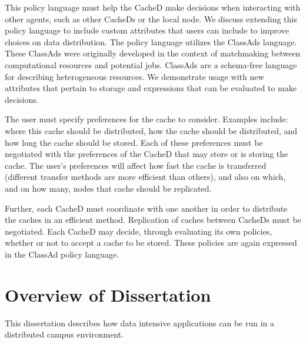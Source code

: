 This policy language must help the CacheD make decisions when interacting with other agents, such as other CacheDs or the local node.  We discuss extending this policy language to include custom attributes that users can include to improve choices on data distribution.  The policy language utilizes the \mbox{ClassAds} \cite{raman1998matchmaking} language.  These \mbox{ClassAds} were originally developed in the context of matchmaking between computational resources and potential jobs.  ClassAds are a schema-free language for describing heterogeneous resources.  We demonstrate usage with new attributes that pertain to storage and expressions that can be evaluated to make decisions.

The user must specify preferences for the cache to consider.  Examples include: where this cache should be distributed, how the cache should be distributed, and how long the cache should be stored.  Each of these preferences must be negotiated with the preferences of the CacheD that may store or is storing the cache.  The user's preferences will affect how fast the cache is transferred (different transfer methods are more efficient than others), and also on which, and on how many, nodes that cache should be replicated.

Further, each CacheD must coordinate with one another in order to distribute the caches in an efficient method.  Replication of caches between CacheDs must be negotiated.  Each CacheD may decide, through evaluating its own policies, whether or not to accept a cache to be stored.  These policies are again expressed in the ClassAd policy language.



\section{Overview of Dissertation}

This dissertation describes how data intensive applications can be run in a distributed campus environment.

